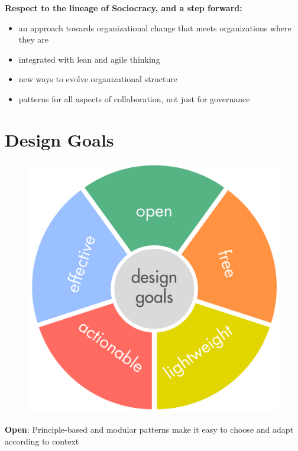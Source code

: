 \textbf{Respect to the lineage of Sociocracy, and a step forward:}

\begin{itemize}
\item an approach towards organizational change that meets organizations where they are

\item integrated with lean and agile thinking

\item new ways to evolve organizational structure

\item patterns for all aspects of collaboration, not just for governance

\end{itemize}

\section{Design Goals}
\label{designgoals}

\begin{figure}[htbp]
\centering
\includegraphics[keepaspectratio,width=\textwidth,height=0.75\textheight]{img/general/design-goals.png}
\end{figure}

\textbf{Open}: Principle-based and modular patterns make it easy to choose and adapt according to context

